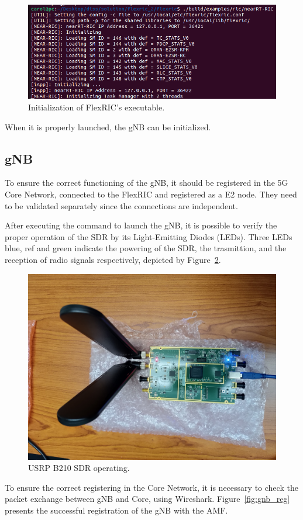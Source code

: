\begin{figure}[H]
    \centering
    \includegraphics[width=0.5\linewidth]{figures/flexric_init}
    \caption{Initialization of FlexRIC's executable.}
    \label{fig:near-rt-ric}
\end{figure}

When it is properly launched, the gNB can be initialized.

\subsection{gNB}\label{subsec:gnb}
To ensure the correct functioning of the gNB, it should be registered in the 5G Core Network, connected to the FlexRIC and registered as a E2 node.
They need to be validated separately since the connections are independent.

After executing the command to launch the gNB\@, it is possible to verify the proper operation of the SDR by its Light-Emitting Diodes (LEDs).
Three LEDs blue, ref and green indicate the powering of the SDR, the trasmittion, and the reception of radio signals respectively, depicted by Figure~\ref{fig:usrp_working}.

\begin{figure}[H]
    \centering
    \includegraphics[width=0.5\linewidth]{figures/usrp_working}
    \caption[USRP B210 SDR operating]{USRP B210 SDR operating.}
    \label{fig:usrp_working}
\end{figure}

To ensure the correct registering in the Core Network, it is necessary to check the packet exchange between gNB and Core, using Wireshark.
Figure~\ref{fig:gnb_reg} presents the successful registration of the gNB with the AMF\@.


